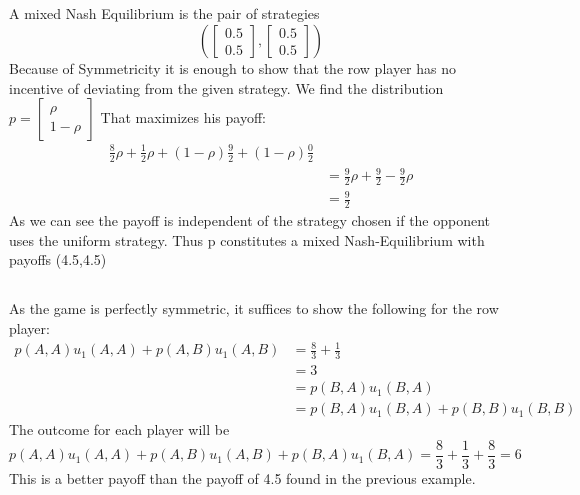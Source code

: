 \documentclass[]{article}
\begin{document}
\subsection{}
A mixed Nash Equilibrium is the pair of strategies
\[\left(
    \begin{bmatrix}
      0.5 \\ 0.5 
    \end{bmatrix}
,    \begin{bmatrix}
      0.5 \\ 0.5 
    \end{bmatrix}\right) \]
Because of Symmetricity it is enough to show that the row player has no incentive of deviating from the given strategy. We find the distribution $p =     \begin{bmatrix}
      \rho \\ 1-\rho  
    \end{bmatrix} $ 
That maximizes his payoff:
\begin{align*} 
   \frac{8}{2}\rho + \frac{1}{2}\rho + (1-\rho) \frac{9}{2} + (1-\rho) \frac{0}{2} \\
  &= \frac{9}{2}\rho + \frac{9}{2} - \frac{9}{2}\rho \\
  &= \frac{9}{2}     
\end{align*}
As we can see the payoff is independent of the strategy chosen if the opponent uses the uniform strategy. Thus p constitutes a mixed Nash-Equilibrium with payoffs (4.5,4.5)
\subsection{}
As the game is perfectly symmetric, it suffices to show the following for the row player:
\begin{align*}
p(A,A)u_1(A,A) + p(A,B)u_1(A,B) & = \frac{8}{3}+ \frac{1}{3} \\ &= 3\\ &=   p(B,A)u_1(B,A) \\ &= p(B,A)u_1(B,A) + p(B,B)u_1(B,B) 
\end{align*}                                  
The outcome for each player will be
\[p(A,A)u_1(A,A)+p(A,B)u_1(A,B)+p(B,A)u_1(B,A) = \frac{8}{3}+\frac{1}{3}+\frac{8}{3} = 6\]
This is a better payoff than the payoff of 4.5 found in the previous example.
\end{document}
